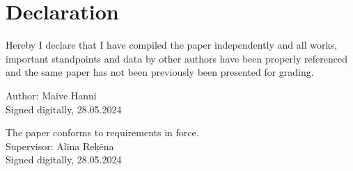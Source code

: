 \chapter*{Declaration}
\thispagestyle{empty}

Hereby I declare that I have compiled the paper independently and all works, important standpoints and data by other authors have been properly referenced and the same paper has not been previously been presented for grading.

Author: Maive Hanni \\
Signed digitally, 28.05.2024 

\vspace{1.5cm}

The paper conforms to requirements in force. \\
Supervisor: Alīna Reķēna \\
Signed digitally, 28.05.2024



